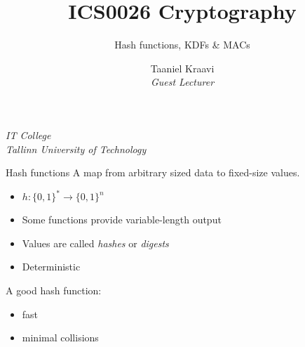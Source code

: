 

\usepackage[dvipsnames]{xcolor}

\usepackage{booktabs}

\usepackage{fancyvrb}

\usepackage{csquotes}

\usepackage{graphicx}
\graphicspath{ {../../images/} }

\usepackage{pgfplots}
\usetikzlibrary{positioning,calc,external}

\usepackage{crysymb}

\renewcommand*{\arraystretch}{1.2}

\usepackage{soul}
\usepackage[en-GB]{datetime2}

\usetikzlibrary{positioning,calc}
\graphicspath{ {../../images/} }

\title[Short version of title]{ICS0026 Cryptography}
\subtitle{Hash functions, KDFs \& MACs}
\date{}
\author%
{%
    {Taaniel Kraavi}\\
    \textit{\footnotesize Guest Lecturer}
}
\institute%
{%
    \textit{IT College}\\
    \textit{Tallinn University of Technology}
}


\begin{frame}
  \titlepage
\end{frame}

\begin{frame}{Hash functions}
  \pause
  A map from arbitrary sized data to fixed-size values.
  \begin{itemize}[<+(1)->]
    \item $h:\{0,1\}^* \to \{0,1\}^n$
    \item Some functions provide variable-length output
    \item Values are called \emph{hashes} or \emph{digests}
    \item Deterministic
  \end{itemize}

  \vspace*{1em}

  \pause
  A good hash function:
  \begin{itemize}[<+(1)->]
    \item fast
    \item minimal collisions
  \end{itemize}
\end{frame}


